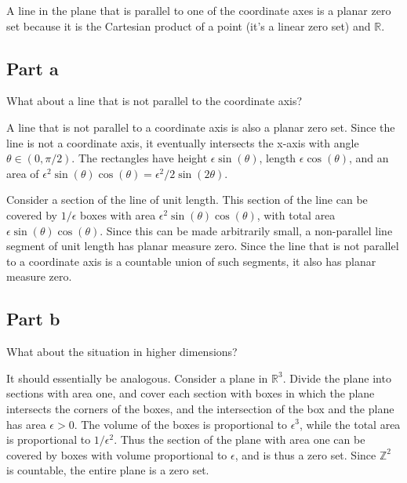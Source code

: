 \documentclass{article}
\newcommand{\R}{\mathbb{R}}
\newcommand{\Z}{\mathbb{Z}}
\begin{document}
A line in the plane that is parallel to one of the coordinate axes is a planar zero set because it is the Cartesian product of a point (it's a linear zero set) and $\R$.

\subsection*{Part a}

What about a line that is not parallel to the coordinate axis?

A line that is not parallel to a coordinate axis is also a planar zero set. Since the line is not a coordinate axis, it eventually intersects the x-axis with angle $\theta \in (0, \pi/2)$. The rectangles have height $\epsilon \sin(\theta)$, length $\epsilon \cos(\theta)$, and an area of $\epsilon^2 \sin(\theta) \cos(\theta) = \epsilon^2/2 \sin(2\theta)$.

Consider a section of the line of unit length. This section of the line can be covered by $1/\epsilon$ boxes with area $\epsilon^2 \sin(\theta) \cos(\theta)$, with total area $\epsilon \sin(\theta) \cos(\theta)$. Since this can be made arbitrarily small, a non-parallel line segment of unit length has planar measure zero. Since the line that is not parallel to a coordinate axis is a countable union of such segments, it also has planar measure zero.

\subsection*{Part b}

What about the situation in higher dimensions?

It should essentially be analogous. Consider a plane in $\R^3$.  Divide the plane into sections with area one, and cover each section with boxes in which the plane intersects the corners of the boxes, and the intersection of the box and the plane has area $\epsilon > 0$. The volume of the boxes is proportional to $\epsilon^3$, while the total area is proportional to $1/\epsilon^2$. Thus the section of the plane with area one can be covered by boxes with volume proportional to $\epsilon$, and is thus a zero set. Since $\Z^2$ is countable, the entire plane is a zero set.
\end{document}
